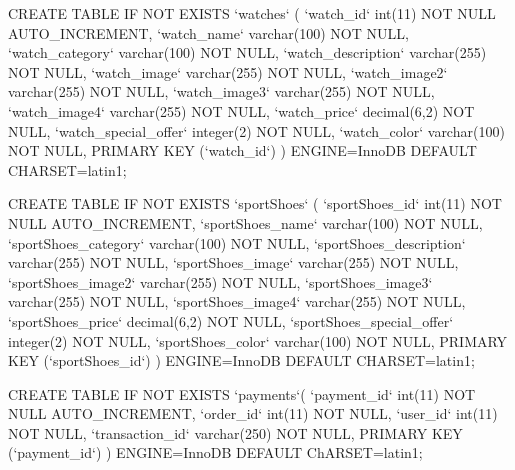 CREATE TABLE IF NOT EXISTS `watches` (
    `watch_id` int(11) NOT NULL AUTO_INCREMENT,
    `watch_name` varchar(100) NOT NULL,
    `watch_category` varchar(100) NOT NULL,
    `watch_description` varchar(255) NOT NULL,
    `watch_image` varchar(255) NOT NULL,
    `watch_image2` varchar(255) NOT NULL,
    `watch_image3` varchar(255) NOT NULL,
    `watch_image4` varchar(255) NOT NULL,
    `watch_price` decimal(6,2) NOT NULL,
    `watch_special_offer` integer(2) NOT NULL,
    `watch_color` varchar(100) NOT NULL,
    PRIMARY KEY (`watch_id`)
) ENGINE=InnoDB DEFAULT CHARSET=latin1;

CREATE TABLE IF NOT EXISTS `sportShoes` (
    `sportShoes_id` int(11) NOT NULL AUTO_INCREMENT,
    `sportShoes_name` varchar(100) NOT NULL,
    `sportShoes_category` varchar(100) NOT NULL,
    `sportShoes_description` varchar(255) NOT NULL,
    `sportShoes_image` varchar(255) NOT NULL,
    `sportShoes_image2` varchar(255) NOT NULL,
    `sportShoes_image3` varchar(255) NOT NULL,
    `sportShoes_image4` varchar(255) NOT NULL,
    `sportShoes_price` decimal(6,2) NOT NULL,
    `sportShoes_special_offer` integer(2) NOT NULL,
    `sportShoes_color` varchar(100) NOT NULL,
    PRIMARY KEY (`sportShoes_id`)
) ENGINE=InnoDB DEFAULT CHARSET=latin1;

CREATE TABLE IF NOT EXISTS `payments`(
	`payment_id` int(11) NOT NULL AUTO_INCREMENT,
    `order_id` int(11) NOT NULL,
    `user_id` int(11) NOT NULL,
    `transaction_id` varchar(250) NOT NULL,
    PRIMARY KEY (`payment_id`)
) ENGINE=InnoDB DEFAULT ChARSET=latin1;